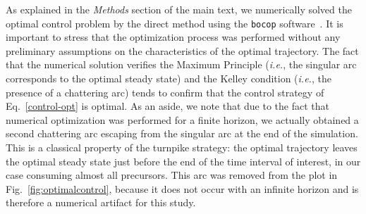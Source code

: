 \documentclass[a4paper,12pt]{article}
\newcommand{\tr}[1]{{#1}}
\begin{document}
\tr{As explained in the \textit{Methods} section of the main text, we} numerically solved the optimal control problem by the direct method using the \texttt{bocop} software~\cite{bonnans_bocop_2012}. 
It is important to stress that the optimization process was performed without any preliminary assumptions on the characteristics of the optimal trajectory. 
The fact that the numerical solution verifies the Maximum Principle (\textit{i.e.}, the singular arc corresponds to the optimal steady state) and the Kelley condition (\textit{i.e.}, the presence of a chattering arc)
tends to confirm that the control strategy of Eq.~\ref{control-opt} is optimal. As an aside, we note that due to the fact that numerical optimization was performed for a finite horizon, we actually obtained a second chattering arc escaping from the singular arc at the end of the simulation.  This is a classical property of the turnpike strategy: the optimal trajectory leaves the optimal steady state just before the end of the time interval of interest, in our case consuming almost all precursors. This arc was removed from the plot in Fig.~\ref{fig:optimalcontrol}, because it does not occur with an infinite horizon and is therefore a numerical artifact for this study.



\end{document}
